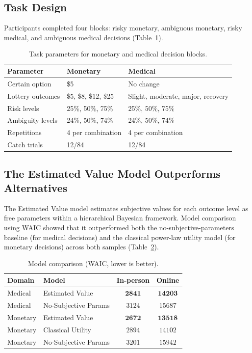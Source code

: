 \documentclass[11pt]{article}
\begin{document}
\subsection{Task Design}

Participants completed four blocks: risky monetary, ambiguous monetary, risky medical, and ambiguous medical decisions (Table~\ref{tab:task}).

\begin{table}[H]
\centering
\caption{Task parameters for monetary and medical decision blocks.}
\label{tab:task}
\begin{tabular}{lll}
\toprule
\textbf{Parameter} & \textbf{Monetary} & \textbf{Medical} \\
\midrule
Certain option & \$5 & No change \\
Lottery outcomes & \$5, \$8, \$12, \$25 & Slight, moderate, major, recovery \\
Risk levels & 25\%, 50\%, 75\% & 25\%, 50\%, 75\% \\
Ambiguity levels & 24\%, 50\%, 74\% & 24\%, 50\%, 74\% \\
Repetitions & 4 per combination & 4 per combination \\
Catch trials & 12/84 & 12/84 \\
\bottomrule
\end{tabular}
\end{table}

\subsection{The Estimated Value Model Outperforms Alternatives}

The Estimated Value model estimates subjective values for each outcome level as free parameters within a hierarchical Bayesian framework. Model comparison using WAIC \citep{vehtari2017practical} showed that it outperformed both the no-subjective-parameters baseline (for medical decisions) and the classical power-law utility model (for monetary decisions) across both samples (Table~\ref{tab:modelcomp}).

\begin{table}[H]
\centering
\caption{Model comparison (WAIC, lower is better).}
\label{tab:modelcomp}
\begin{tabular}{llcc}
\toprule
\textbf{Domain} & \textbf{Model} & \textbf{In-person} & \textbf{Online} \\
\midrule
Medical & Estimated Value & $\mathbf{2841}$ & $\mathbf{14203}$ \\
Medical & No-Subjective Params & $3124$ & $15687$ \\
Monetary & Estimated Value & $\mathbf{2672}$ & $\mathbf{13518}$ \\
Monetary & Classical Utility & $2894$ & $14102$ \\
Monetary & No-Subjective Params & $3201$ & $15942$ \\
\bottomrule
\end{tabular}
\end{table}
\end{document}
